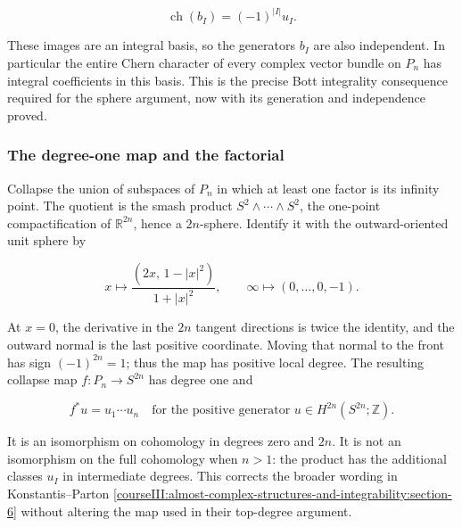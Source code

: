 \begin{equation}
\operatorname{ch}(b_I)=(-1)^{|I|}u_I.
\label{courseIII:almost-complex-structures-and-integrability:eq:10.11}
\end{equation}

These images are an integral basis, so the generators \(b_I\) are also independent. In particular the entire Chern character of every complex vector bundle on \(P_n\) has integral coefficients in this basis. This is the precise Bott integrality consequence required for the sphere argument, now with its generation and independence proved.

\subsubsection{The degree-one map and the factorial}
\label{courseIII:almost-complex-structures-and-integrability:section-10.4}

Collapse the union of subspaces of \(P_n\) in which at least one factor is its infinity point. The quotient is the smash product \(S^2\wedge\cdots\wedge S^2\), the one-point compactification of \(\mathbb R^{2n}\), hence a \(2n\)-sphere. Identify it with the outward-oriented unit sphere by

\begin{equation}
x\longmapsto\frac{(2x,\,1-|x|^2)}{1+|x|^2},
\qquad \infty\longmapsto(0,\ldots,0,-1).
\label{courseIII:almost-complex-structures-and-integrability:eq:10.12}
\end{equation}

At \(x=0\), the derivative in the \(2n\) tangent directions is twice the identity, and the outward normal is the last positive coordinate. Moving that normal to the front has sign \((-1)^{2n}=1\); thus the map has positive local degree. The resulting collapse map \(f:P_n\to S^{2n}\) has degree one and

\begin{equation}
f^*u=u_1\cdots u_n
\quad\text{for the positive generator }u\in H^{2n}(S^{2n};\mathbb Z).
\label{courseIII:almost-complex-structures-and-integrability:eq:10.13}
\end{equation}

It is an isomorphism on cohomology in degrees zero and \(2n\). It is not an isomorphism on the full cohomology when \(n>1\): the product has the additional classes \(u_I\) in intermediate degrees. This corrects the broader wording in Konstantis--Parton \cref{courseIII:almost-complex-structures-and-integrability:section-6} without altering the map used in their top-degree argument.

